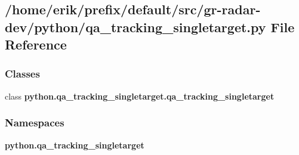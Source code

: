 \subsection{/home/erik/prefix/default/src/gr-\/radar-\/dev/python/qa\+\_\+tracking\+\_\+singletarget.py File Reference}
\label{qa__tracking__singletarget_8py}
\subsubsection*{Classes}
\begin{DoxyCompactItemize}
\item 
class {\bf python.\+qa\+\_\+tracking\+\_\+singletarget.\+qa\+\_\+tracking\+\_\+singletarget}
\end{DoxyCompactItemize}
\subsubsection*{Namespaces}
\begin{DoxyCompactItemize}
\item 
 {\bf python.\+qa\+\_\+tracking\+\_\+singletarget}
\end{DoxyCompactItemize}
